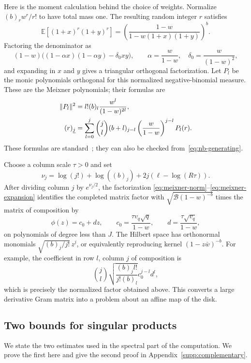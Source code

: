 Here is the moment calculation behind the choice of weights. Normalize $(b)_rw^r/r!$ to have total mass one. The resulting random integer $r$ satisfies
\begin{equation}\label{eq:nb-generating}
 \mathbb E[(1+x)^r(1+y)^r]
 =\left(\frac{1-w}{1-w(1+x)(1+y)}\right)^b.
\end{equation}
Factoring the denominator as
\begingroup{}
\[
 (1-w)\bigl((1-\alpha x)(1-\alpha y)-\delta_0xy\bigr),
 \qquad \alpha=\frac w{1-w},\quad
 \delta_0=\frac w{(1-w)^2},
\]
\endgroup
and expanding in $x$ and $y$ gives a triangular orthogonal factorization. Let $P_l$ be the monic polynomials orthogonal for this normalized
negative-binomial measure. These are the Meixner polynomials; their formulas are
\begin{align}
 \|P_l\|^2&=l!(b)_l\frac{w^l}{(1-w)^{2l}},\label{eq:meixner-norm}\\
 (r)_{\underline{j}}&=\sum_{l=0}^j\binom jl(b+l)_{j-l}
          \left(\frac w{1-w}\right)^{j-l}P_l(r).
 \label{eq:meixner-expansion}
\end{align}
These formulas are standard~\cite[Sections~18.19 and~18.23]{dlmf}; they can also be checked from~\eqref{eq:nb-generating}.

Choose a column scale $\tau>0$ and set
\begin{equation}\label{eq:column-prices}
 \nu_j=\log(j!)+\log((b)_j)+2j(\ell-\log(R\tau)).
\end{equation}
After dividing column $j$ by $e^{\nu_j/2}$, the factorization
\eqref{eq:meixner-norm}--\eqref{eq:meixner-expansion} identifies the completed matrix factor with
$\sqrt{\mathcal B(1-w)^{-b}}$ times the matrix of composition by
\begin{equation}\label{eq:affine-map}
 \phi(z)=c_0+dz,\qquad
 c_0=\frac{\tau v_q\sqrt q}{1-w},\qquad
 d=\frac{\tau\sqrt{v_q}}{1-w},
\end{equation}
on polynomials of degree less than $J$. The Hilbert space has orthonormal monomials $\sqrt{(b)_j/j!}\,z^j$, or equivalently reproducing kernel $(1-z\bar w)^{-b}$. For example, the coefficient in row $l$, column $j$ of composition is
\[
 \binom jl\sqrt{\frac{(b)_j l!}{j!(b)_l}}c_0^{j-l}d^l,
\]
which is precisely the normalized factor obtained above. This converts a large derivative Gram matrix into a problem about an affine map of the disk.

\subsection{Two bounds for singular products}
We state the two estimates used in the spectral part of the computation. We prove the first here and give the second proof in Appendix~\ref{supp:complementary}.

